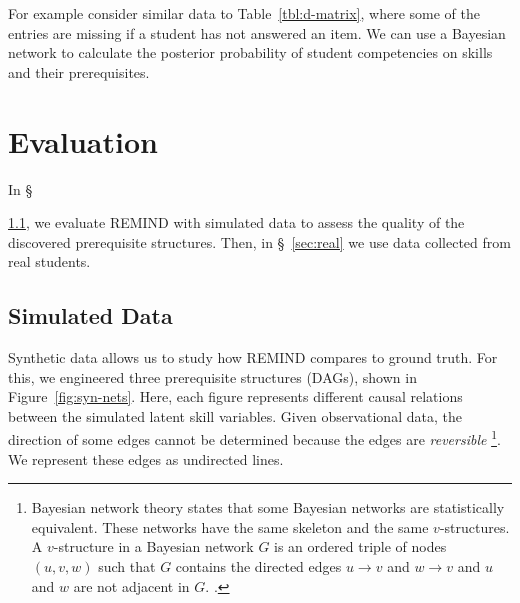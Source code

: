 \documentclass{edm_template}
\newcommand{\hl}[1]{\colorbox{yellow}{#1}}
\begin{document}
For example consider similar data   to  Table~\ref{tbl:d-matrix},  where some of the entries are missing if a student has not answered an item.
We can use a Bayesian network to calculate the posterior probability of student competencies on skills and their prerequisites.

\section{Evaluation}
In \S~{\ref{sec:synthetic}, we  evaluate REMIND with simulated data  to assess the quality of the discovered prerequisite structures.
	Then, in \S~\ref{sec:real} we  use  data collected from real students.
	
	
	\subsection{Simulated Data}
	\label{sec:synthetic}
	
	Synthetic data allows us to study how REMIND compares to ground truth.
	For this, we engineered three prerequisite structures (DAGs), shown in Figure~\ref{fig:syn-nets}.
	Here, each figure represents different causal relations between the simulated latent skill variables.
	Given observational data, the direction of some edges cannot be determined because the edges are \emph{reversible}%
	\footnote{
		Bayesian network theory states that some Bayesian networks  are statistically equivalent.
		These networks have the same skeleton and the same $v$-structures.
		A $v$-structure in a Bayesian network $G$ is an ordered triple of nodes $(u,v,w)$ such that $G$ contains the directed edges $u\rightarrow v$ and $w\rightarrow v$ and $u$ and $w$ are not adjacent in $G$. \cite{verma1990equivalence}.
	}.
	We represent these edges as undirected lines.
	
}
\end{document}
